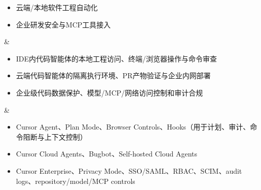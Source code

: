 \begin{longtblr}[
  caption = {北美主流AI智能体安全产品与落地方向},
  label   = {tab:north-america-agent-security-products},
]
\begin{itemize}[leftmargin=*,topsep=0pt,partopsep=0pt,itemsep=1pt,parsep=0pt]
    \item 云端/本地软件工程自动化
    \item 企业研发安全与MCP工具接入
  \end{itemize}
& \begin{itemize}[leftmargin=*,topsep=0pt,partopsep=0pt,itemsep=1pt,parsep=0pt]
    \item IDE内代码智能体的本地工程访问、终端/浏览器操作与命令审查
    \item 云端代码智能体的隔离执行环境、PR产物验证与企业内网部署
    \item 企业级代码数据保护、模型/MCP/网络访问控制和审计合规
    \end{itemize}
& \begin{itemize}[leftmargin=*,topsep=0pt,partopsep=0pt,itemsep=1pt,parsep=0pt]
    \item Cursor Agent、Plan Mode、Browser Controls、Hooks（用于计划、审计、命令阻断与上下文控制）~\cite{cursor17changelog2025,cursorplanmode2025,cursorhooks2025}
    \item Cursor Cloud Agents、Bugbot、Self-hosted Cloud Agents ~\cite{cursorcloudagents2025,cursorbugbot2025,cursorselfhostedcloudagents2026}
    \item Cursor Enterprise、Privacy Mode、SSO/SAML、RBAC、SCIM、audit logs、repository/model/MCP controls ~\cite{cursorsecurity2026,cursorenterprise2026}
    \end{itemize} \\
\hline
\end{longtblr}
\endgroup





